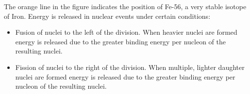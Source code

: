 \documentclass[12pt]{article}
\begin{document}
The orange line in the figure indicates the position of Fe-56, a very stable isotope of Iron. Energy is released in nuclear events under certain conditions:

\begin{itemize}
\item Fusion of nuclei to the left of the division. When heavier nuclei are formed energy is released due to the greater binding energy per nucleon of the resulting nuclei.

\item Fission of nuclei to the right of the division. When multiple, lighter daughter nuclei are formed energy is released due to the greater binding energy per nucleon of the resulting nuclei.
\end{itemize}
\end{document}
